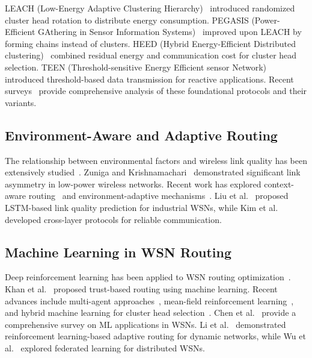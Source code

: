 \documentclass[sensors,article,submit,moreauthors,pdftex]{Definitions/mdpi}
\begin{document}
LEACH (Low-Energy Adaptive Clustering Hierarchy)~\cite{Heinzelman2000LEACH,Heinzelman2002LEACH} introduced randomized cluster head rotation to distribute energy consumption. PEGASIS (Power-Efficient GAthering in Sensor Information Systems)~\cite{Lindsey2002PEGASIS} improved upon LEACH by forming chains instead of clusters. HEED (Hybrid Energy-Efficient Distributed clustering)~\cite{Younis2004HEED} combined residual energy and communication cost for cluster head selection. TEEN (Threshold-sensitive Energy Efficient sensor Network)~\cite{Manjeshwar2001TEEN} introduced threshold-based data transmission for reactive applications. Recent surveys~\cite{Singh2021Energy,Mohapatra2022Survey} provide comprehensive analysis of these foundational protocols and their variants.

\subsection{Environment-Aware and Adaptive Routing}

The relationship between environmental factors and wireless link quality has been extensively studied~\cite{Zuniga2004,Baccour2012RLQE}. Zuniga and Krishnamachari~\cite{Zuniga2007Asymmetry} demonstrated significant link asymmetry in low-power wireless networks. Recent work has explored context-aware routing~\cite{Zhao2019Context,Yang2023Context} and environment-adaptive mechanisms~\cite{Liu2018Environment,ElFouly2023ILP}. Liu et al.~\cite{Liu2024LSTM} proposed LSTM-based link quality prediction for industrial WSNs, while Kim et al.~\cite{Kim2022Cross} developed cross-layer protocols for reliable communication.

\subsection{Machine Learning in WSN Routing}

Deep reinforcement learning has been applied to WSN routing optimization~\cite{Kaur2021,Ren2024,Okine2024,Zhang2024DRL}. Khan et al.~\cite{Khan2021} proposed trust-based routing using machine learning. Recent advances include multi-agent approaches~\cite{Okine2024}, mean-field reinforcement learning~\cite{Ren2024}, and hybrid machine learning for cluster head selection~\cite{Kumar2024Hybrid}. Chen et al.~\cite{Chen2023Survey} provide a comprehensive survey on ML applications in WSNs. Li et al.~\cite{Li2023Reinforcement} demonstrated reinforcement learning-based adaptive routing for dynamic networks, while Wu et al.~\cite{Wu2022Federated} explored federated learning for distributed WSNs.
\end{document}
